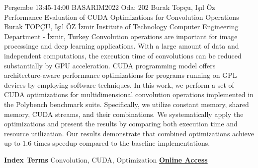 
    \begin{abstract_basarim}
    {Perşembe 13:45-14:00}
    {BASARIM2022}
    {Oda: 202}
    {Burak Topçu, Işıl Öz}
    {Performance Evaluation of CUDA Optimizations for Convolution Operations}
    {%
    Burak TOPÇU, Işıl ÖZ}
    {%
    }
    {%
    İzmir Institute of Technology Computer Engineering Department - İzmir, Turkey}
    Convolution operations are important for image processinge and deep learning applications. With a large amount of data and independent computations, the execution time of convolutions can be reduced substantially by GPU acceleration. CUDA programming model offers architecture-aware performance optimizations for programs running on GPL devices by employing software techniques. In this work, we perform a set of CUDA optimizations for multidimensional convolution operations implemented in the Polybench benchmark suite. Specifically, we utilize constant memory, shared memory, CUDA streams, and their combinations. We systematically apply the optimizations and present the results by comparing both execution time and resource utilization. Our results demonstrate that combined optimizations achieve up to $1.6$ times speedup compared to the baseline implementations. 
    
            \textbf{Index Terms} \newline{}Convolution, CUDA, Optimization
     \newline\newline\noindent \href{https://drive.google.com/file/d/1hNA0jqJk-ppfkb5Qq93PcOqi_KqydVFc/view?usp=drivesdk}{\bfseries Online Access}
    \end{abstract_basarim}
    